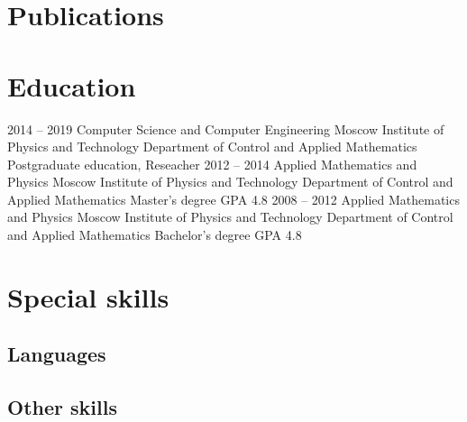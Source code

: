 \documentclass[11pt,a4paper]{moderncv}
\begin{document}
\newpage

\section{Publications}


\section{Education}
  \cventry
    {2014 -- 2019}
    {Computer Science and Computer Engineering}
    {Moscow Institute of Physics and Technology}
    {Department of Control and Applied Mathematics}
    {Postgraduate education, Reseacher}{}
  \cventry
    {2012 -- 2014}
    {Applied Mathematics and Physics}
    {Moscow Institute of Physics and Technology}
    {Department of Control and Applied Mathematics}
    {Master's degree}
    {GPA 4.8}
  \cventry
    {2008 -- 2012}
    {Applied Mathematics and Physics}
    {Moscow Institute of Physics and Technology}
    {Department of Control and Applied Mathematics}
    {Bachelor's degree}
    {GPA 4.8}

\section{Special skills}
\subsection{Languages}
\subsection{Other skills}
\end{document}
